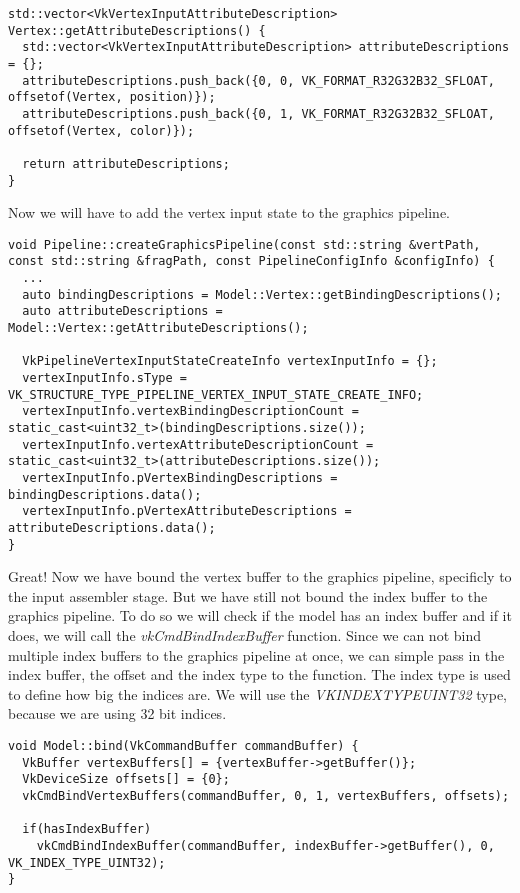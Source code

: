\documentclass[12pt]{report} \usepackage{preamble}
\begin{document}
\begin{lstlisting}[Language=C++]
std::vector<VkVertexInputAttributeDescription> Vertex::getAttributeDescriptions() {
  std::vector<VkVertexInputAttributeDescription> attributeDescriptions = {};
  attributeDescriptions.push_back({0, 0, VK_FORMAT_R32G32B32_SFLOAT, offsetof(Vertex, position)});
  attributeDescriptions.push_back({0, 1, VK_FORMAT_R32G32B32_SFLOAT, offsetof(Vertex, color)});

  return attributeDescriptions;
}
\end{lstlisting}

Now we will have to add the vertex input state to the graphics pipeline.

\begin{lstlisting}[Language=C++]
void Pipeline::createGraphicsPipeline(const std::string &vertPath, const std::string &fragPath, const PipelineConfigInfo &configInfo) {
  ...
  auto bindingDescriptions = Model::Vertex::getBindingDescriptions();
  auto attributeDescriptions = Model::Vertex::getAttributeDescriptions();

  VkPipelineVertexInputStateCreateInfo vertexInputInfo = {};
  vertexInputInfo.sType = VK_STRUCTURE_TYPE_PIPELINE_VERTEX_INPUT_STATE_CREATE_INFO;
  vertexInputInfo.vertexBindingDescriptionCount = static_cast<uint32_t>(bindingDescriptions.size());
  vertexInputInfo.vertexAttributeDescriptionCount = static_cast<uint32_t>(attributeDescriptions.size());
  vertexInputInfo.pVertexBindingDescriptions = bindingDescriptions.data();
  vertexInputInfo.pVertexAttributeDescriptions = attributeDescriptions.data();
}
\end{lstlisting}

Great! Now we have bound the vertex buffer to the graphics pipeline, specificly to the input assembler stage.
But we have still not bound the index buffer to the graphics pipeline. To do so we will check if the model has an index buffer and if it does, we will call the \textit{vkCmdBindIndexBuffer}
function. Since we can not bind multiple index buffers to the graphics pipeline at once, we can simple pass in the index buffer, the offset and the index type to the function.
The index type is used to define how big the indices are. We will use the \textit{VK\textunderscore INDEX\textunderscore TYPE\textunderscore UINT32} type, because we are using 32 bit indices.

\begin{lstlisting}[Language=C++]
void Model::bind(VkCommandBuffer commandBuffer) {
  VkBuffer vertexBuffers[] = {vertexBuffer->getBuffer()};
  VkDeviceSize offsets[] = {0};
  vkCmdBindVertexBuffers(commandBuffer, 0, 1, vertexBuffers, offsets);

  if(hasIndexBuffer)
    vkCmdBindIndexBuffer(commandBuffer, indexBuffer->getBuffer(), 0, VK_INDEX_TYPE_UINT32);
}
\end{lstlisting}
\end{document}
